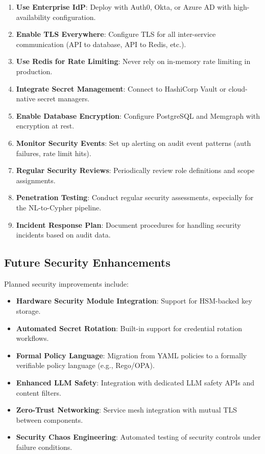 \begin{enumerate}
    \item \textbf{Use Enterprise IdP}: Deploy with Auth0, Okta, or Azure AD with high-availability configuration.
    \item \textbf{Enable TLS Everywhere}: Configure TLS for all inter-service communication (API to database, API to Redis, etc.).
    \item \textbf{Use Redis for Rate Limiting}: Never rely on in-memory rate limiting in production.
    \item \textbf{Integrate Secret Management}: Connect to HashiCorp Vault or cloud-native secret managers.
    \item \textbf{Enable Database Encryption}: Configure PostgreSQL and Memgraph with encryption at rest.
    \item \textbf{Monitor Security Events}: Set up alerting on audit event patterns (auth failures, rate limit hits).
    \item \textbf{Regular Security Reviews}: Periodically review role definitions and scope assignments.
    \item \textbf{Penetration Testing}: Conduct regular security assessments, especially for the NL-to-Cypher pipeline.
    \item \textbf{Incident Response Plan}: Document procedures for handling security incidents based on audit data.
\end{enumerate}

\subsection{Future Security Enhancements}
\label{subsec:future-security}

Planned security improvements include:

\begin{itemize}
    \item \textbf{Hardware Security Module Integration}: Support for HSM-backed key storage.
    \item \textbf{Automated Secret Rotation}: Built-in support for credential rotation workflows.
    \item \textbf{Formal Policy Language}: Migration from YAML policies to a formally verifiable policy language (e.g., Rego/OPA).
    \item \textbf{Enhanced LLM Safety}: Integration with dedicated LLM safety APIs and content filters.
    \item \textbf{Zero-Trust Networking}: Service mesh integration with mutual TLS between components.
    \item \textbf{Security Chaos Engineering}: Automated testing of security controls under failure conditions.
\end{itemize}

